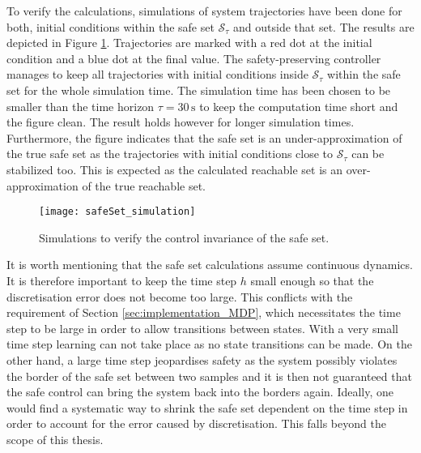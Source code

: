 \documentclass[../main.tex]{subfiles}
\begin{document}
To verify the calculations, simulations of system trajectories have been done for both, initial conditions within the safe set $\mathcal{S}_\tau$ and outside that set. The results are depicted in Figure \ref{fig:safeSet_simulation}. Trajectories are marked with a red dot at the initial condition and a blue dot at the final value. The safety-preserving controller manages to keep all trajectories with initial conditions inside $\mathcal{S}_\tau$ within the safe set for the whole simulation time. The simulation time has been chosen to be smaller than the time horizon $\tau = 30 \,\text{s}$ to keep the computation time short and the figure clean. The result holds however for longer simulation times. Furthermore, the figure indicates that the safe set is an under-approximation of the true safe set as the trajectories with initial conditions close to $\mathcal{S}_\tau$ can be stabilized too. This is expected as the calculated reachable set is an over-approximation of the true reachable set. \par
\begin{figure}[h]
    \centering
    \texttt{[image: safeSet\_simulation]}
        \caption{Simulations to verify the control invariance of the safe set.}    
    \label{fig:safeSet_simulation}
\end{figure}
It is worth mentioning that the safe set calculations assume continuous dynamics. It is therefore important to keep the time step $h$ small enough so that the discretisation error does not become too large. This conflicts with the requirement of Section \ref{sec:implementation_MDP}, which necessitates the time step to be large in order to allow transitions between states. With a very small time step learning can not take place as no state transitions can be made. On the other hand, a large time step jeopardises safety as the system possibly violates the border of the safe set between two samples and it is then not guaranteed that the safe control can bring the system back into the borders again. Ideally, one would find a systematic way to shrink the safe set dependent on the time step in order to account for the error caused by discretisation. This falls beyond the scope of this thesis. \par 
\end{document}

